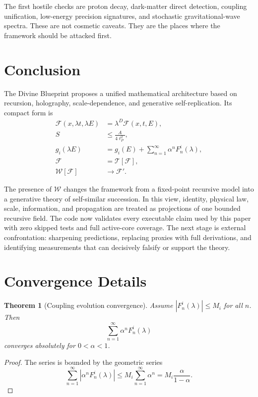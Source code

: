 \documentclass[12pt]{article}
\newtheorem{theorem}{Theorem}[section]
\theoremstyle{remark}
\newcommand{\F}{\mathcal{F}}
\newcommand{\T}{\mathcal{T}}
\newcommand{\W}{\mathcal{W}}
\begin{document}
The first hostile checks are proton decay, dark-matter direct detection,
coupling unification, low-energy precision signatures, and stochastic
gravitational-wave spectra.  These are not cosmetic caveats.  They are the
places where the framework should be attacked first.

\section{Conclusion}

The Divine Blueprint proposes a unified mathematical architecture based on
recursion, holography, scale-dependence, and generative self-replication.  Its
compact form is
\begin{align}
  \F(x,\lambda t,\lambda E) &= \lambda^D\F(x,t,E),\\
  S &\leq \frac{A}{4\ell_P^2},\\
  g_i(\lambda E) &=
    g_i(E)+\sum_{n=1}^{\infty}\alpha^nF_n^i(\lambda),\\
  \F &= \T[\F],\\
  \W[\F] &\longrightarrow \F'.
\end{align}

The presence of $\W$ changes the framework from a fixed-point recursive model
into a generative theory of self-similar succession.  In this view, identity,
physical law, scale, information, and propagation are treated as projections of
one bounded recursive field.  The code now validates every executable claim used
by this paper with zero skipped tests and full active-core coverage.  The
next stage is external confrontation: sharpening predictions, replacing proxies
with full derivations, and identifying measurements that can decisively falsify
or support the theory.

\appendix

\section{Convergence Details}

\begin{theorem}[Coupling evolution convergence]
Assume $|F_n^i(\lambda)|\leq M_i$ for all $n$.  Then
\begin{equation}
  \sum_{n=1}^{\infty}\alpha^nF_n^i(\lambda)
\end{equation}
converges absolutely for $0<\alpha<1$.
\end{theorem}

\begin{proof}
The series is bounded by the geometric series
\begin{equation}
  \sum_{n=1}^{\infty}|\alpha^nF_n^i(\lambda)|
  \leq
  M_i\sum_{n=1}^{\infty}\alpha^n
  =
  M_i\frac{\alpha}{1-\alpha}.
\end{equation}
\end{proof}
\end{document}
